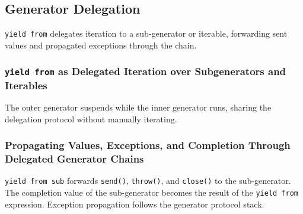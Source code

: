 \subsection{Generator Delegation}

\texttt{yield from} delegates iteration to a sub-generator or iterable, forwarding sent values and propagated exceptions through the chain.

\subsubsection{\texttt{yield from} as Delegated Iteration over Subgenerators and Iterables}



The outer generator suspends while the inner generator runs, sharing the delegation protocol without manually iterating.

\subsubsection{Propagating Values, Exceptions, and Completion Through Delegated Generator Chains}

\texttt{yield from sub} forwards \texttt{send()}, \texttt{throw()}, and \texttt{close()} to the sub-generator. The completion value of the sub-generator becomes the result of the \texttt{yield from} expression. Exception propagation follows the generator protocol stack.
